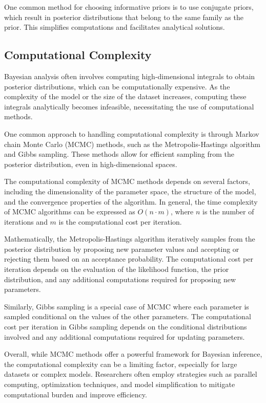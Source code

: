 \documentclass[12pt]{book} %
\begin{document}
One common method for choosing informative priors is to use conjugate priors, which result in posterior distributions that belong to the same family as the prior. This simplifies computations and facilitates analytical solutions.

\subsection{Computational Complexity}

Bayesian analysis often involves computing high-dimensional integrals to obtain posterior distributions, which can be computationally expensive. As the complexity of the model or the size of the dataset increases, computing these integrals analytically becomes infeasible, necessitating the use of computational methods.

One common approach to handling computational complexity is through Markov chain Monte Carlo (MCMC) methods, such as the Metropolis-Hastings algorithm and Gibbs sampling. These methods allow for efficient sampling from the posterior distribution, even in high-dimensional spaces.

The computational complexity of MCMC methods depends on several factors, including the dimensionality of the parameter space, the structure of the model, and the convergence properties of the algorithm. In general, the time complexity of MCMC algorithms can be expressed as \(O(n \cdot m)\), where \(n\) is the number of iterations and \(m\) is the computational cost per iteration.

Mathematically, the Metropolis-Hastings algorithm iteratively samples from the posterior distribution by proposing new parameter values and accepting or rejecting them based on an acceptance probability. The computational cost per iteration depends on the evaluation of the likelihood function, the prior distribution, and any additional computations required for proposing new parameters.

Similarly, Gibbs sampling is a special case of MCMC where each parameter is sampled conditional on the values of the other parameters. The computational cost per iteration in Gibbs sampling depends on the conditional distributions involved and any additional computations required for updating parameters.

Overall, while MCMC methods offer a powerful framework for Bayesian inference, the computational complexity can be a limiting factor, especially for large datasets or complex models. Researchers often employ strategies such as parallel computing, optimization techniques, and model simplification to mitigate computational burden and improve efficiency.
\end{document}
